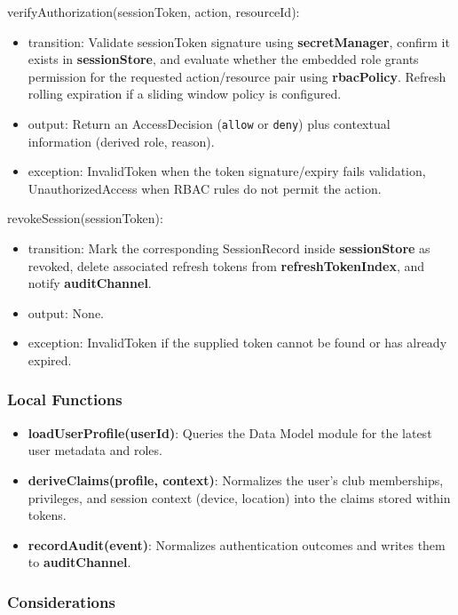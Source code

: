 \documentclass[12pt, titlepage]{article}
\begin{document}
\noindent verifyAuthorization(sessionToken, action, resourceId):
\begin{itemize}
  \item transition: Validate sessionToken signature using \textbf{secretManager}, confirm it exists in \textbf{sessionStore}, and evaluate whether the embedded role grants permission for the requested action/resource pair using \textbf{rbacPolicy}. Refresh rolling expiration if a sliding window policy is configured.
  \item output: Return an AccessDecision (\texttt{allow} or \texttt{deny}) plus contextual information (derived role, reason).
  \item exception: InvalidToken when the token signature/expiry fails validation, UnauthorizedAccess when RBAC rules do not permit the action.
\end{itemize}

\noindent revokeSession(sessionToken):
\begin{itemize}
  \item transition: Mark the corresponding SessionRecord inside \textbf{sessionStore} as revoked, delete associated refresh tokens from \textbf{refreshTokenIndex}, and notify \textbf{auditChannel}.
  \item output: None.
  \item exception: InvalidToken if the supplied token cannot be found or has already expired.
\end{itemize}

\subsubsection{Local Functions}

\begin{itemize}
  \item \textbf{loadUserProfile(userId)}: Queries the Data Model module for the latest user metadata and roles.
  \item \textbf{deriveClaims(profile, context)}: Normalizes the user's club memberships, privileges, and session context (device, location) into the claims stored within tokens.
  \item \textbf{recordAudit(event)}: Normalizes authentication outcomes and writes them to \textbf{auditChannel}.
\end{itemize}

\subsubsection{Considerations}
\end{document}
